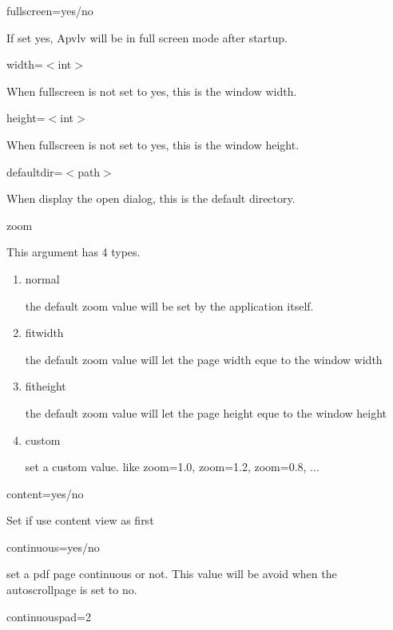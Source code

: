 \documentclass[a4paper,12pt]{article}
\newcommand{\apvlv}{\textsf{Apvlv{ }}}
\begin{document}
\begin{description}

\item fullscreen=yes/no

If set yes, \apvlv will be in full screen mode after startup.

\item width=$<$int$>$

When fullscreen is not set to yes, this is the window width.

\item height=$<$int$>$

When fullscreen is not set to yes, this is the window height.

\item defaultdir=$<$path$>$

When display the open dialog, this is the default directory.

\item zoom

This argument has 4 types.

\begin{enumerate}

\item normal

the default zoom value will be set by the application itself.

\item fitwidth

the default zoom value will let the page width eque to the window width

\item fitheight

the default zoom value will let the page height eque to the window height

\item custom

set a custom value. like zoom=1.0, zoom=1.2, zoom=0.8, ...

\end{enumerate}

\item content=yes/no

Set if use content view as first

\item continuous=yes/no

set a pdf page continuous or not. This value will be avoid when the autoscrollpage is set to no.

\item continuouspad=2


\end{description}
\end{document}
